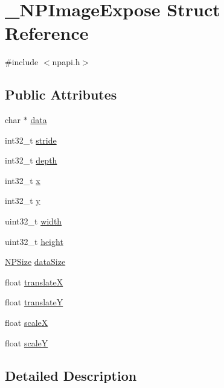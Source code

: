 \hypertarget{struct___n_p_image_expose}{
\section{\_\-NPImageExpose Struct Reference}
\label{struct___n_p_image_expose}
}


{\ttfamily \#include $<$npapi.h$>$}

\subsection*{Public Attributes}
\begin{DoxyCompactItemize}
\item 
char $\ast$ \hyperlink{struct___n_p_image_expose_a4261d6867119c1ffe0bd4fe44cbaa4d0}{data}
\item 
int32\_\-t \hyperlink{struct___n_p_image_expose_a615500c6ef3cea7b86f61a02bd8dfbcf}{stride}
\item 
int32\_\-t \hyperlink{struct___n_p_image_expose_aaef2311fadc6309c258e045087706697}{depth}
\item 
int32\_\-t \hyperlink{struct___n_p_image_expose_a636eff0e6eb37cc897f3968e2bbcd645}{x}
\item 
int32\_\-t \hyperlink{struct___n_p_image_expose_a25c47ac7da24f57ef6bba671e1b8d33b}{y}
\item 
uint32\_\-t \hyperlink{struct___n_p_image_expose_ac250a8831a9bc7b97ea911baa38a17b5}{width}
\item 
uint32\_\-t \hyperlink{struct___n_p_image_expose_a6f672c7697b1e6a029278bacacd7936a}{height}
\item 
\hyperlink{struct___n_p_size}{NPSize} \hyperlink{struct___n_p_image_expose_a38e94219212019a5e5f3fb87b6634e82}{dataSize}
\item 
float \hyperlink{struct___n_p_image_expose_a7ccc8c007a7033f1cf6620bf05d917c4}{translateX}
\item 
float \hyperlink{struct___n_p_image_expose_ab7a799a5a3cf7efeaca5eb0fc1d5265d}{translateY}
\item 
float \hyperlink{struct___n_p_image_expose_a459e533407f02b3b01de9307a26acf70}{scaleX}
\item 
float \hyperlink{struct___n_p_image_expose_a758b274482a925e928a9c452bf500ede}{scaleY}
\end{DoxyCompactItemize}


\subsection{Detailed Description}


